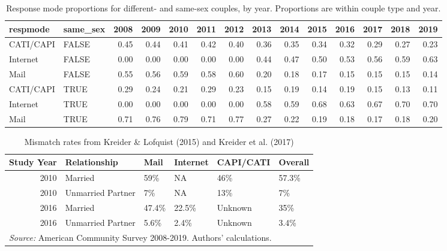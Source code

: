 \documentclass[
  11pt,
]{article}
\begin{document}
\begin{table}[!h]

\caption{\label{tab:respmode}Response mode proportions for different- and same-sex couples, by year. Proportions are within couple type and year.}
\centering
\fontsize{9}{11}\selectfont
\begin{tabular}[t]{llrrrrrrrrrrrr}
\toprule
respmode & same\_sex & 2008 & 2009 & 2010 & 2011 & 2012 & 2013 & 2014 & 2015 & 2016 & 2017 & 2018 & 2019\\
\midrule
CATI/CAPI & FALSE & 0.45 & 0.44 & 0.41 & 0.42 & 0.40 & 0.36 & 0.35 & 0.34 & 0.32 & 0.29 & 0.27 & 0.23\\
Internet & FALSE & 0.00 & 0.00 & 0.00 & 0.00 & 0.00 & 0.44 & 0.47 & 0.50 & 0.53 & 0.56 & 0.59 & 0.63\\
Mail & FALSE & 0.55 & 0.56 & 0.59 & 0.58 & 0.60 & 0.20 & 0.18 & 0.17 & 0.15 & 0.15 & 0.15 & 0.14\\
CATI/CAPI & TRUE & 0.29 & 0.24 & 0.21 & 0.29 & 0.23 & 0.15 & 0.19 & 0.14 & 0.19 & 0.15 & 0.13 & 0.11\\
Internet & TRUE & 0.00 & 0.00 & 0.00 & 0.00 & 0.00 & 0.58 & 0.59 & 0.68 & 0.63 & 0.67 & 0.70 & 0.70\\
\addlinespace
Mail & TRUE & 0.71 & 0.76 & 0.79 & 0.71 & 0.77 & 0.27 & 0.22 & 0.19 & 0.18 & 0.17 & 0.18 & 0.20\\
\bottomrule
\end{tabular}
\end{table}

\begin{table}[!h]

\caption{\label{tab:mismatch}Mismatch rates from Kreider \& Lofquist (2015) and Kreider et al. (2017)}
\centering
\begin{tabular}[t]{rlllll}
\toprule
Study Year & Relationship & Mail & Internet & CAPI/CATI & Overall\\
\midrule
2010 & Married & 59\% & NA & 46\% & 57.3\%\\
2010 & Unmarried Partner & 7\% & NA & 13\% & 7\%\\
2016 & Married & 47.4\% & 22.5\% & Unknown & 35\%\\
2016 & Unmarried Partner & 5.6\% & 2.4\% & Unknown & 3.4\%\\
\bottomrule
\multicolumn{6}{l}{\rule{0pt}{1em}\textit{Source:} American Community Survey 2008-2019. Authors' calculations.}\\
\end{tabular}
\end{table}
\end{document}
